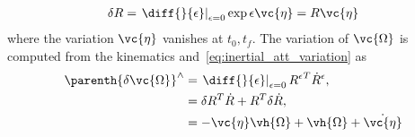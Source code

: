 \begin{align}\label{eq:inertial_att_variation}
    \delta R =  \left.\diff{}{\epsilon}\right|_{\epsilon=0} \exp \epsilon \vc{\eta} = R \vc{\eta}
\end{align}
where the variation \( \vc{\eta} \) vanishes at \( t_0, t_f\).
The variation of \( \vc{\Omega} \) is computed from the kinematics and~\cref{eq:inertial_att_variation} as
\begin{align}
    \parenth{\delta \vc{\Omega}}^\wedge  &= \left. \diff{}{\epsilon}\right|_{\epsilon=0} {R^\epsilon}^T \dot{R}^\epsilon, \nonumber \\
                                         &= \delta R^T \dot{R} + R^T \delta \dot{R}, \nonumber \\
                                         &= - \vc{\eta} \vh{\Omega} + \vh{\Omega} + \dot{\vc{\eta}}\label{eq:inertial_ang_vel_variation}
\end{align}

